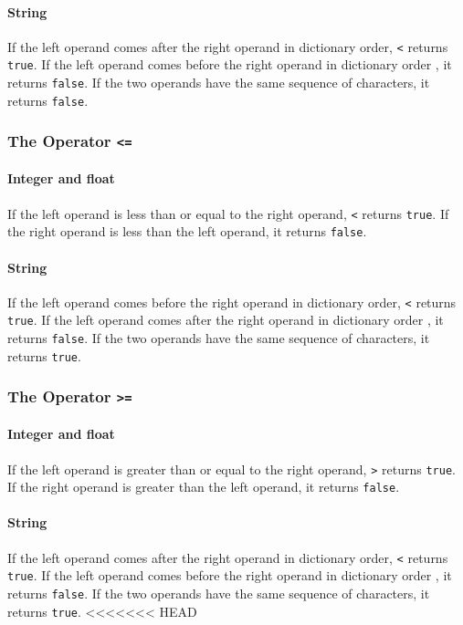 \paragraph{String}
If the left operand comes after the right operand in dictionary order, \verb!<! returns \verb!true!. If the left operand comes before the right operand in dictionary order , it returns \verb!false!. If the two operands have the same sequence of characters, it returns \verb!false!.

\subsubsection{The Operator {\tt <=}}
\paragraph{Integer and float}
If the left operand is less than or equal to the right operand, \verb!<! returns \verb!true!. If the right operand is less than the left operand, it returns \verb!false!.
\paragraph{String}
If the left operand comes before the right operand in dictionary order, \verb!<! returns \verb!true!. If the left operand comes after the right operand in dictionary order , it returns \verb!false!. If the two operands have the same sequence of characters, it returns \verb!true!.

\subsubsection{The Operator {\tt >=}}
\paragraph{Integer and float}
If the left operand is greater than or equal to the right operand, \verb!>! returns \verb!true!. If the right operand is greater than the left operand, it returns \verb!false!.
\paragraph{String}
If the left operand comes after the right operand in dictionary order, \verb!<! returns \verb!true!. If the left operand comes before the right operand in dictionary order , it returns \verb!false!. If the two operands have the same sequence of characters, it returns \verb!true!.
<<<<<<< HEAD

